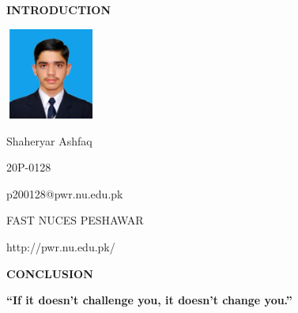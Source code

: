 \documentclass{letter}
\begin{document}
	\begin{center}
	\huge{\bfseries INTRODUCTION}
	\end{center}	

\bigskip
\bigskip
\bigskip
\bigskip

\begin{flushright}

\includegraphics[height=3cm, width=3cm]{shaheryar.jpg}

\vspace{-4cm}

\end{flushright}


	\begin{flushleft}


\large 
	Shaheryar Ashfaq
	\smallskip


20P-0128
\smallskip

p200128@pwr.nu.edu.pk
\smallskip

FAST NUCES PESHAWAR
\smallskip

http://pwr.nu.edu.pk/

   \end{flushleft}

\bigskip

	\begin{center}

	\huge{\bfseries CONCLUSION}
	\end{center}
\bigskip

\bfseries{“If it doesn’t challenge you, it doesn’t change you.”}
\end{document}
